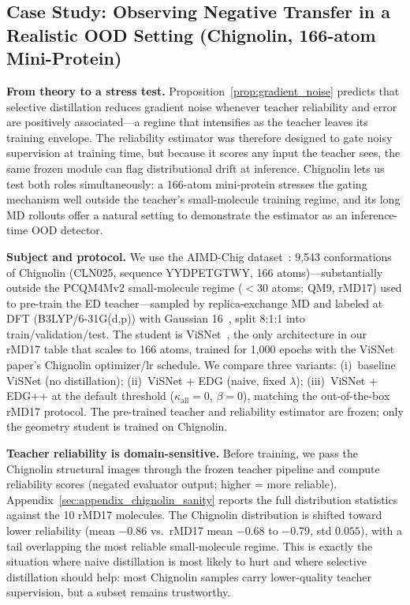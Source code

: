 \FloatBarrier

\subsection{Case Study: Observing Negative Transfer in a Realistic OOD Setting (Chignolin, 166-atom Mini-Protein)}
\label{sec:case_study_chignolin}

\textbf{From theory to a stress test.} Proposition~\ref{prop:gradient_noise} predicts that selective distillation reduces gradient noise whenever teacher reliability and error are positively associated---a regime that intensifies as the teacher leaves its training envelope. The reliability estimator was therefore designed to gate noisy supervision at training time, but because it scores any input the teacher sees, the same frozen module can flag distributional drift at inference. Chignolin lets us test both roles simultaneously: a 166-atom mini-protein stresses the gating mechanism well outside the teacher's small-molecule training regime, and its long MD rollouts offer a natural setting to demonstrate the estimator as an inference-time OOD detector.

\textbf{Subject and protocol.} We use the AIMD-Chig dataset~\cite{wang2023aimdchig}: 9{,}543 conformations of Chignolin (CLN025, sequence YYDPETGTWY, 166 atoms)---substantially outside the PCQM4Mv2 small-molecule regime ($<\!30$ atoms; QM9, rMD17) used to pre-train the ED teacher---sampled by replica-exchange MD and labeled at DFT (B3LYP/6-31G(d,p)) with Gaussian 16~\cite{frisch2016gaussian16}, split 8:1:1 into train/validation/test. The student is ViSNet~\cite{wang2024enhancing}, the only architecture in our rMD17 table that scales to 166 atoms, trained for 1{,}000 epochs with the ViSNet paper's Chignolin optimizer/lr schedule. We compare three variants: (i)~baseline ViSNet (no distillation); (ii)~ViSNet + EDG (naive, fixed $\lambda$); (iii)~ViSNet + EDG++ at the default threshold ($\kappa_{\text{all}}\!=\!0$, $\beta\!=\!0$), matching the out-of-the-box rMD17 protocol. The pre-trained teacher and reliability estimator are frozen; only the geometry student is trained on Chignolin.

\textbf{Teacher reliability is domain-sensitive.} Before training, we pass the Chignolin structural images through the frozen teacher pipeline and compute reliability scores (negated evaluator output; higher = more reliable). Appendix~\ref{sec:appendix_chignolin_sanity} reports the full distribution statistics against the 10 rMD17 molecules. The Chignolin distribution is shifted toward lower reliability (mean $-0.86$ vs.\ rMD17 mean $-0.68$ to $-0.79$, std $0.055$), with a tail overlapping the most reliable small-molecule regime. This is exactly the situation where naive distillation is most likely to hurt and where selective distillation should help: most Chignolin samples carry lower-quality teacher supervision, but a subset remains trustworthy.

